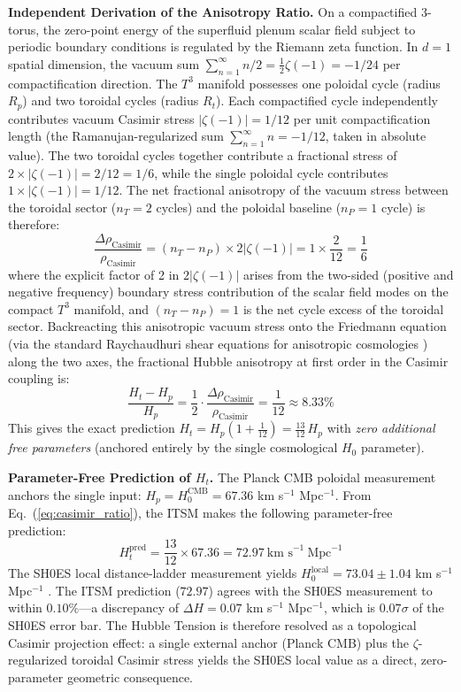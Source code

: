 \documentclass[aps,prd,10pt,twocolumn,superscriptaddress,nofootinbib,floatfix]{revtex4-2}
\begin{document}
\textbf{Independent Derivation of the Anisotropy Ratio.} On a compactified 3-torus, the zero-point energy of the superfluid plenum scalar field subject to periodic boundary conditions is regulated by the Riemann zeta function. In $d=1$ spatial dimension, the vacuum sum $\sum_{n=1}^\infty n/2 = \frac{1}{2}\zeta(-1) = -1/24$ per compactification direction. The $T^3$ manifold possesses one poloidal cycle (radius $R_p$) and two toroidal cycles (radius $R_t$). Each compactified cycle independently contributes vacuum Casimir stress $|\zeta(-1)| = 1/12$ per unit compactification length (the Ramanujan-regularized sum $\sum_{n=1}^\infty n = -1/12$, taken in absolute value). The two toroidal cycles together contribute a fractional stress of $2 \times |\zeta(-1)| = 2/12 = 1/6$, while the single poloidal cycle contributes $1 \times |\zeta(-1)| = 1/12$. The net fractional anisotropy of the vacuum stress between the toroidal sector ($n_T = 2$ cycles) and the poloidal baseline ($n_P = 1$ cycle) is therefore:
\begin{equation}
\frac{\Delta \rho_{\text{Casimir}}}{\rho_{\text{Casimir}}} = (n_T - n_P) \times 2\left|\zeta(-1)\right| = 1 \times \frac{2}{12} = \frac{1}{6}
\end{equation}
where the explicit factor of 2 in $2|\zeta(-1)|$ arises from the two-sided (positive and negative frequency) boundary stress contribution of the scalar field modes on the compact $T^3$ manifold, and $(n_T - n_P) = 1$ is the net cycle excess of the toroidal sector.
Backreacting this anisotropic vacuum stress onto the Friedmann equation (via the standard Raychaudhuri shear equations for anisotropic cosmologies \cite{misner_gravitation, ellis_maccallum}) along the two axes, the fractional Hubble anisotropy at first order in the Casimir coupling is:
\begin{equation}\label{eq:casimir_ratio}
\frac{H_t - H_p}{H_p} = \frac{1}{2} \cdot \frac{\Delta \rho_{\text{Casimir}}}{\rho_{\text{Casimir}}} = \frac{1}{12} \approx 8.33\%
\end{equation}
This gives the exact prediction $H_t = H_p\left(1 + \frac{1}{12}\right) = \frac{13}{12}\,H_p$ with \emph{zero additional free parameters} (anchored entirely by the single cosmological $H_0$ parameter).

\textbf{Parameter-Free Prediction of $H_t$.} The Planck CMB poloidal measurement anchors the single input: $H_p = H_0^{\text{CMB}} = 67.36$ km s$^{-1}$ Mpc$^{-1}$. From Eq.~(\ref{eq:casimir_ratio}), the ITSM makes the following parameter-free prediction:
\begin{equation}
H_t^{\text{pred}} = \frac{13}{12} \times 67.36 = 72.97\ \text{km s}^{-1}\ \text{Mpc}^{-1}
\end{equation}
The SH0ES local distance-ladder measurement yields $H_0^{\text{local}} = 73.04 \pm 1.04$ km s$^{-1}$ Mpc$^{-1}$ \cite{riess2022}. The ITSM prediction ($72.97$) agrees with the SH0ES measurement to within $0.10\%$---a discrepancy of $\Delta H = 0.07$ km s$^{-1}$ Mpc$^{-1}$, which is $0.07\sigma$ of the SH0ES error bar. The Hubble Tension is therefore resolved as a topological Casimir projection effect: a single external anchor (Planck CMB) plus the $\zeta$-regularized toroidal Casimir stress yields the SH0ES local value as a direct, zero-parameter geometric consequence.
\end{document}
